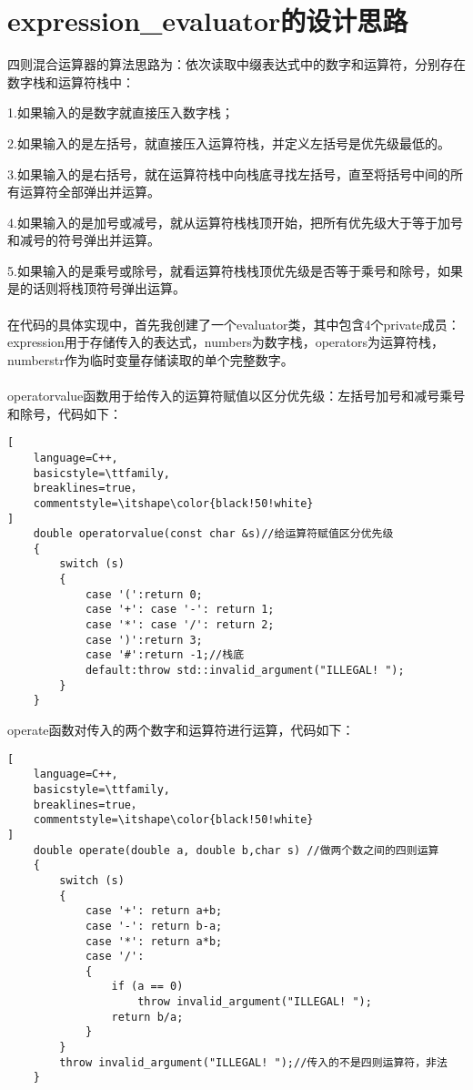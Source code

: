 \documentclass[UTF8]{ctexart}
\begin{document}
\pagestyle{fancy}
\fancyhead{}

\section{expression\_evaluator的设计思路}
四则混合运算器的算法思路为：依次读取中缀表达式中的数字和运算符，分别存在数字栈和运算符栈中：

1.如果输入的是数字就直接压入数字栈；

2.如果输入的是左括号，就直接压入运算符栈，并定义左括号是优先级最低的。

3.如果输入的是右括号，就在运算符栈中向栈底寻找左括号，直至将括号中间的所有运算符全部弹出并运算。

4.如果输入的是加号或减号，就从运算符栈栈顶开始，把所有优先级大于等于加号和减号的符号弹出并运算。

5.如果输入的是乘号或除号，就看运算符栈栈顶优先级是否等于乘号和除号，如果是的话则将栈顶符号弹出运算。
\\ \\
在代码的具体实现中，首先我创建了一个evaluator类，其中包含4个private成员：expression用于存储传入的表达式，numbers为数字栈，operators为运算符栈，
numberstr作为临时变量存储读取的单个完整数字。
\\ \\
operatorvalue函数用于给传入的运算符赋值以区分优先级：左括号\<加号和减号\<乘号和除号，代码如下：
\begin{lstlisting}[
    language=C++,
    basicstyle=\ttfamily,
    breaklines=true，
    commentstyle=\itshape\color{black!50!white}
]
    double operatorvalue(const char &s)//给运算符赋值区分优先级
    {
        switch (s)
        {
            case '(':return 0;
            case '+': case '-': return 1;
            case '*': case '/': return 2;
            case ')':return 3;
            case '#':return -1;//栈底
            default:throw std::invalid_argument("ILLEGAL! ");
        }
    }
\end{lstlisting}

operate函数对传入的两个数字和运算符进行运算，代码如下：
\begin{lstlisting}[
    language=C++,
    basicstyle=\ttfamily,
    breaklines=true，
    commentstyle=\itshape\color{black!50!white}
]
    double operate(double a, double b,char s) //做两个数之间的四则运算
    {
        switch (s)
        {
            case '+': return a+b;
            case '-': return b-a;
            case '*': return a*b;
            case '/': 
            {
                if (a == 0) 
                    throw invalid_argument("ILLEGAL! ");
                return b/a;
            }
        }
        throw invalid_argument("ILLEGAL! ");//传入的不是四则运算符，非法
    }
\end{lstlisting}
\end{document}
